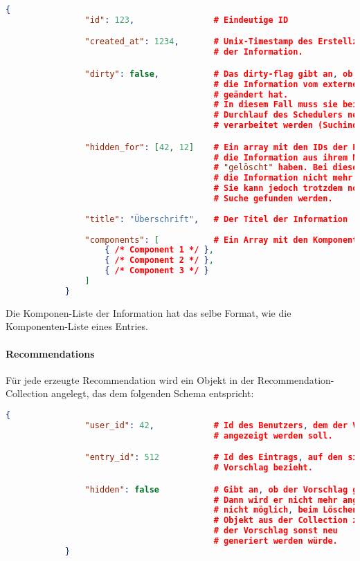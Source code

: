 		\begin{lstlisting}[language=JSON]
			{
				"id": 123,                # Eindeutige ID

				"created_at": 1234,       # Unix-Timestamp des Erstellzeitpunktes
				                          # der Information.

				"dirty": false,           # Das dirty-flag gibt an, ob sich
				                          # die Information vom externen Service
				                          # geändert hat.
				                          # In diesem Fall muss sie beim nächsten
				                          # Durchlauf des Schedulers neu
				                          # verarbeitet werden (Suchindex!).

				"hidden_for": [42, 12]    # Ein array mit den IDs der Benutzer, die
				                          # die Information aus ihrem Newsfeed
				                          # "gelöscht" haben. Bei diesen wird 
				                          # die Information nicht mehr angezeigt.
				                          # Sie kann jedoch trotzdem noch über die
				                          # Suche gefunden werden.
				
				"title": "Überschrift",   # Der Titel der Information
				
				"components": [           # Ein Array mit den Komponenten der Information
					{ /* Component 1 */ },
					{ /* Component 2 */ },
					{ /* Component 3 */ }
				]
			}
		\end{lstlisting}

		Die Komponen-Liste der Information hat das selbe Format, wie die Komponenten-Liste eines Entries.

	\paragraph{Recommendations} %
	\label{par:reccomendations}
		
		Für jede erzeugte Recommendation wird ein Objekt in der Recommendation-Collection angelegt, das dem folgenden Schema entspricht:

		\begin{lstlisting}[language=JSON]
			{
				"user_id": 42,            # Id des Benutzers, dem der Vorschlag
				                          # angezeigt werden soll.

				"entry_id": 512           # Id des Eintrags, auf den sich der
				                          # Vorschlag bezieht.

				"hidden": false           # Gibt an, ob der Vorschlag gelöscht wurde. 
				                          # Dann wird er nicht mehr angezeigt. Es ist 
				                          # nicht möglich, beim Löschen einfach das 
				                          # Objekt aus der Collection zu löschen, da 
				                          # der Vorschlag sonst neu
				                          # generiert werden würde. 
			}
		\end{lstlisting}

